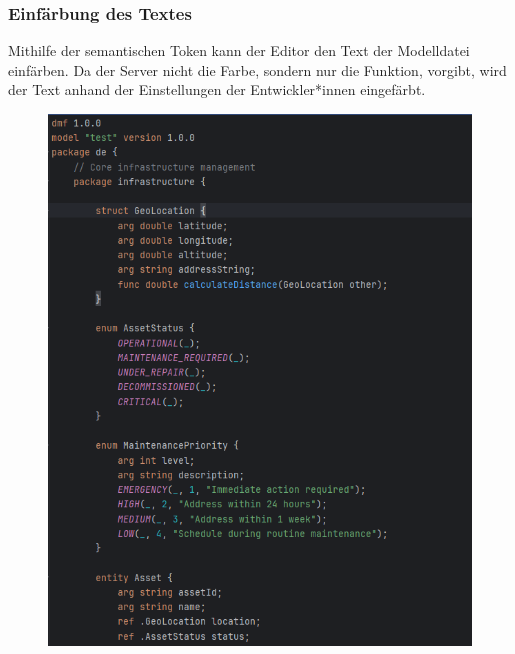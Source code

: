 \documentclass[./einleitung.tex]{subfiles}
\begin{document}
    \subsubsection{Einfärbung des Textes}\label{subsubsec:useSemanticTokens}
    Mithilfe der semantischen Token kann der Editor den Text der Modelldatei einfärben.
    Da der Server nicht die Farbe, sondern nur die Funktion, vorgibt, wird der Text anhand der Einstellungen der Entwickler*innen eingefärbt.
    \begin{figure}[H]
        \centering
        \includegraphics[width=\linewidth / 2 - 1em]{bilder/semanticIntellij}

\end{figure}
\end{document}
